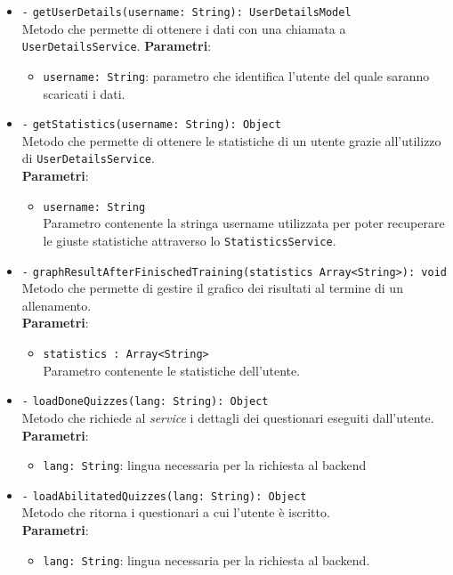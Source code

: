 \begin{itemize}
\begin{itemize}
		\item \texttt{-} \texttt{getUserDetails(username: String): UserDetailsModel} \\ Metodo che permette di ottenere i dati con una chiamata a \texttt{UserDetailsService}.
		\textbf{Parametri}:
		\begin{itemize}
			\item \texttt{username: String}: parametro che identifica l'utente del quale saranno scaricati i dati.
		\end{itemize}
		\item \texttt{-} \texttt{getStatistics(username: String): Object} \\ 
		Metodo che permette di ottenere le statistiche di un utente grazie all'utilizzo di \texttt{UserDetailsService}. \\
		\textbf{Parametri}: 
		\begin{itemize}
			\item \texttt{username: String} \\
			Parametro contenente la stringa username utilizzata per poter recuperare le giuste statistiche attraverso lo \texttt{StatisticsService}.
		\end{itemize}
		\item \texttt{-} \texttt{graphResultAfterFinischedTraining(statistics Array<String>): void} \\ 
		Metodo che permette di gestire il grafico dei risultati al termine di un allenamento. \\
		\textbf{Parametri}: 
		\begin{itemize}
			\item \texttt{statistics : Array<String>} \\
			Parametro contenente le statistiche dell'utente.
		\end{itemize}
		\item \texttt{-} \texttt{loadDoneQuizzes(lang: String): Object} \\ Metodo che richiede al \textit{service} i dettagli dei questionari eseguiti dall'utente. \\
		\textbf{Parametri}:
		\begin{itemize}
			\item \texttt{lang: String}: lingua necessaria per la richiesta al backend
		\end{itemize}
		\item \texttt{-} \texttt{loadAbilitatedQuizzes(lang: String): Object} \\Metodo che ritorna i questionari a cui l'utente è iscritto. \\
		\textbf{Parametri}:
		\begin{itemize}
			\item \texttt{lang: String}: lingua necessaria per la richiesta al backend.
		\end{itemize}
	\end{itemize}
\end{itemize}

